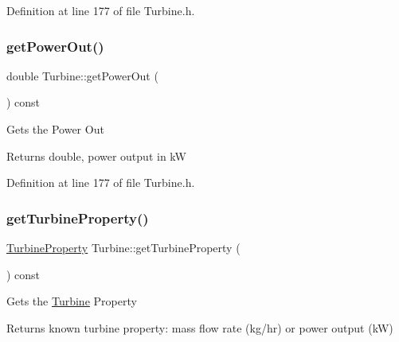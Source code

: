 Definition at line 177 of file Turbine.\+h.

\mbox{\label{class_turbine_a89585cc2fbfdbe67d539eae08c369fa2}} 
\subsubsection{\texorpdfstring{get\+Power\+Out()}{getPowerOut()}\hspace{0.1cm}{\footnotesize\ttfamily [3/3]}}
{\footnotesize\ttfamily double Turbine\+::get\+Power\+Out (\begin{DoxyParamCaption}{ }\end{DoxyParamCaption}) const\hspace{0.3cm}{\ttfamily [inline]}}

Gets the Power Out

\begin{DoxyReturn}{Returns}
double, power output in kW 
\end{DoxyReturn}


Definition at line 177 of file Turbine.\+h.

\mbox{\label{class_turbine_a14f6eff49b501aa8c5a22d404dbeaac0}} 
\subsubsection{\texorpdfstring{get\+Turbine\+Property()}{getTurbineProperty()}\hspace{0.1cm}{\footnotesize\ttfamily [1/3]}}
{\footnotesize\ttfamily \hyperlink{class_turbine_a5db4f65cf2539e3837684d53221ade12}{Turbine\+Property} Turbine\+::get\+Turbine\+Property (\begin{DoxyParamCaption}{ }\end{DoxyParamCaption}) const\hspace{0.3cm}{\ttfamily [inline]}}

Gets the \hyperlink{class_turbine}{Turbine} Property

\begin{DoxyReturn}{Returns}
known turbine property\+: mass flow rate (kg/hr) or power output (kW) 
\end{DoxyReturn}


